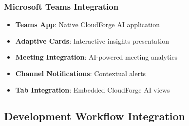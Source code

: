 \subsubsection{Microsoft Teams Integration}

\begin{itemize}
    \item \textbf{Teams App}: Native CloudForge AI application
    \item \textbf{Adaptive Cards}: Interactive insights presentation
    \item \textbf{Meeting Integration}: AI-powered meeting analytics
    \item \textbf{Channel Notifications}: Contextual alerts
    \item \textbf{Tab Integration}: Embedded CloudForge AI views
\end{itemize}

\subsection{Development Workflow Integration}


